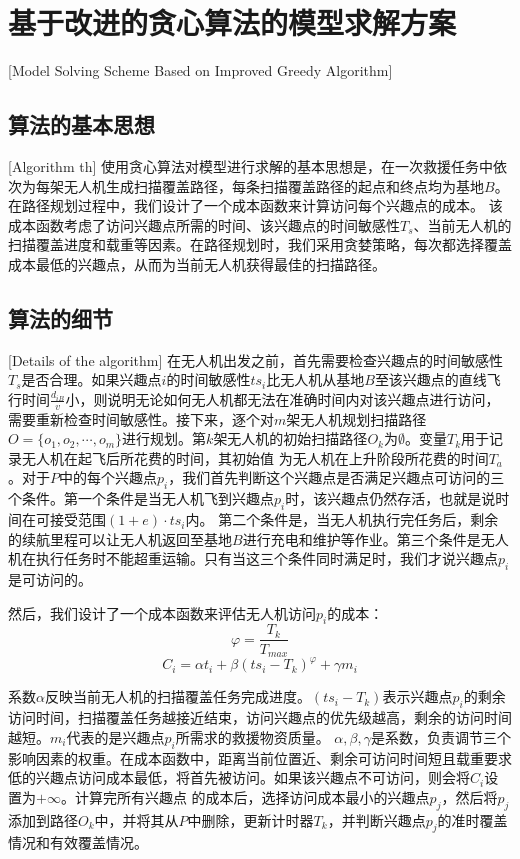 
\chapter{基于改进的贪心算法的模型求解方案}[Model Solving Scheme Based on Improved Greedy Algorithm]

\section{算法的基本思想}[Algorithm th]
使用贪心算法对模型进行求解的基本思想是，在一次救援任务中依次为每架无人机生成扫描覆盖路径，每条扫描覆盖路径的起点和终点均为基地$B$。在路径规划过程中，我们设计了一个成本函数来计算访问每个兴趣点的成本。
该成本函数考虑了访问兴趣点所需的时间、该兴趣点的时间敏感性$T_s$、当前无人机的扫描覆盖进度和载重等因素。在路径规划时，我们采用贪婪策略，每次都选择覆盖成本最低的兴趣点，从而为当前无人机获得最佳的扫描路径。

\section{算法的细节}[Details of the algorithm]
在无人机出发之前，首先需要检查兴趣点的时间敏感性$T_s$是否合理。如果兴趣点$i$的时间敏感性$ts_i$比无人机从基地$B$至该兴趣点的直线飞行时间$\frac{d_{iB}}{v}$小，则说明无论如何无人机都无法在准确时间内对该兴趣点进行访问，
需要重新检查时间敏感性。接下来，逐个对$m$架无人机规划扫描路径$O=\lbrace o_1, o_2, \cdots ,o_m \rbrace$进行规划。第$k$架无人机的初始扫描路径$O_k$为$\emptyset$。变量$T_k$用于记录无人机在起飞后所花费的时间，其初始值
为无人机在上升阶段所花费的时间$T_a$。对于$P$中的每个兴趣点$p_i$，我们首先判断这个兴趣点是否满足兴趣点可访问的三个条件。第一个条件是当无人机飞到兴趣点$p_i$时，该兴趣点仍然存活，也就是说时间在可接受范围$(1+e) \cdot ts_i$内。
第二个条件是，当无人机执行完任务后，剩余的续航里程可以让无人机返回至基地$B$进行充电和维护等作业。第三个条件是无人机在执行任务时不能超重运输。只有当这三个条件同时满足时，我们才说兴趣点$p_i$是可访问的。


然后，我们设计了一个成本函数来评估无人机访问$p_i$的成本：
$$ \varphi = \frac{T_k}{T_{max}}$$
$$ C_i = \alpha t_i + \beta (ts_i - T_k)^\varphi + \gamma m_i $$


系数$\alpha$反映当前无人机的扫描覆盖任务完成进度。$(ts_i - T_k)$表示兴趣点$p_i$的剩余访问时间，扫描覆盖任务越接近结束，访问兴趣点的优先级越高，剩余的访问时间越短。$m_i$代表的是兴趣点$p_i$所需求的救援物资质量。
$\alpha,\beta,\gamma$是系数，负责调节三个影响因素的权重。在成本函数中，距离当前位置近、剩余可访问时间短且载重要求低的兴趣点访问成本最低，将首先被访问。如果该兴趣点不可访问，则会将$C_i$设置为$+\infty$。计算完所有兴趣点
的成本后，选择访问成本最小的兴趣点$p_j$，然后将$p_j$添加到路径$O_k$中，并将其从$P$中删除，更新计时器$T_k$，并判断兴趣点$p_j$的准时覆盖情况和有效覆盖情况。


